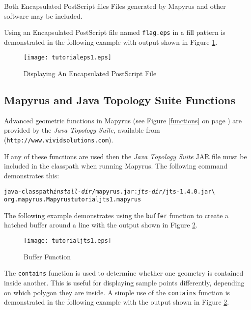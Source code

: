Both Encapsulated PostScript files
Files generated by Mapyrus and other software may be included.

Using an Encapsulated PostScript file named \texttt{flag.eps}
in a fill pattern is demonstrated in the following example
with output shown in Figure \ref{tutorialeps1}.



\begin{figure}[htb]
\texttt{[image: tutorialeps1.eps]}
\caption{Displaying An Encapsulated PostScript File}
\label{tutorialeps1}
\end{figure}

\subsection{Mapyrus and Java Topology Suite Functions}
\label{tutorialjts}

Advanced geometric functions in Mapyrus
(see Figure \ref{functions} on page \pageref{functions})
are provided by the
\textit{Java Topology Suite},
available from
(\texttt{http://www.vividsolutions.com}).

If any of these functions are used then the
\textit{Java Topology Suite} JAR file must be included in the
classpath when running Mapyrus.  The following command demonstrates this:

\begin{alltt}
java -classpath \textit{install-dir}/mapyrus.jar:\textit{jts-dir}/jts-1.4.0.jar \textbackslash
  org.mapyrus.Mapyrus tutorialjts1.mapyrus
\end{alltt}

The following example demonstrates using the \texttt{buffer} function to
create a hatched buffer around a line
with the output shown in Figure \ref{tutorialjts1}.



\begin{figure}[htb]
\texttt{[image: tutorialjts1.eps]}
\caption{Buffer Function}
\label{tutorialjts1}
\end{figure}

The \texttt{contains} function is used to determine whether one geometry
is contained inside another.  This is useful for displaying sample points
differently, depending on which polygon they are inside.
A simple use of the \texttt{contains} function is
demonstrated in the following example
with the output shown in Figure \ref{tutorialjts1}.

